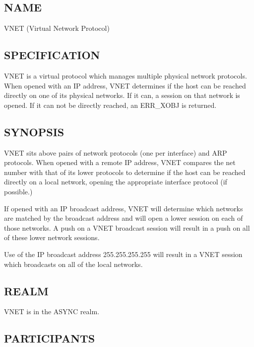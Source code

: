 %
%
%

\subsection*{NAME}

\noindent VNET (Virtual Network Protocol)

\subsection*{SPECIFICATION}

\noindent 

VNET is a virtual protocol which manages multiple physical network
protocols.  
When opened with an IP address, VNET determines if the host can be
reached directly on one of its physical networks.  If it can, a
session on that network is opened.  If it can not be directly reached,
an ERR\_XOBJ is returned.

\subsection*{SYNOPSIS}

\noindent

VNET sits above pairs of network protocols (one per interface) and ARP
protocols.  When opened with a remote IP address, VNET compares the
net number with that of its lower protocols to determine if the host
can be reached directly on a local network, opening the appropriate
interface protocol (if possible.)

If opened with an IP broadcast address, VNET will determine which
networks are matched by the broadcast address and will open a lower
session on each of those networks.  A push on a VNET broadcast session will
result in a push on all of these lower network sessions.

Use of the IP broadcast address 255.255.255.255 will result in a
VNET session which broadcasts on all of the local networks.


\subsection*{REALM}

VNET is in the ASYNC realm.

\subsection*{PARTICIPANTS}

